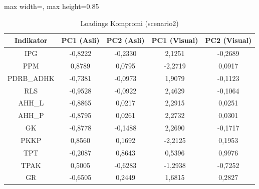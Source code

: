 \begin{table}[H]
\centering
\caption{Loadings Kompromi (scenario2)} \label{tab:app2loadings}
\begin{adjustbox}{max width=\textwidth, max height=0.85\textheight}
\begin{tabular}{|c|c|c|c|c|}
\hline
\textbf{Indikator} & \textbf{PC1 (Asli)} & \textbf{PC2 (Asli)} & \textbf{PC1 (Visual)} & \textbf{PC2 (Visual)} \\
\hline
IPG & -0,8222 & -0,2330 & 2,1251 & -0,2689 \\
PPM & 0,8789 & 0,0795 & -2,2719 & 0,0917 \\
PDRB\_ADHK & -0,7381 & -0,0973 & 1,9079 & -0,1123 \\
RLS & -0,9528 & -0,0922 & 2,4629 & -0,1064 \\
AHH\_L & -0,8865 & 0,0217 & 2,2915 & 0,0251 \\
AHH\_P & -0,8795 & 0,0261 & 2,2732 & 0,0301 \\
GK & -0,8778 & -0,1488 & 2,2690 & -0,1717 \\
PKKP & 0,8560 & 0,1692 & -2,2125 & 0,1953 \\
TPT & -0,2087 & 0,8643 & 0,5396 & 0,9976 \\
TPAK & 0,5005 & -0,6283 & -1,2938 & -0,7252 \\
GR & -0,6505 & 0,2449 & 1,6815 & 0,2827 \\
\hline
\end{tabular}
\end{adjustbox}
\end{table}